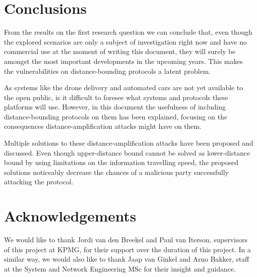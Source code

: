 \documentclass{article}
\begin{document}
\section{Conclusions}
\label{sec:conclusions}

From the results on the first research question we can conclude that, even though the explored scenarios are only a subject of investigation right now and have no commercial use at the moment of writing this document, they will surely be amongst the most important developments in the upcoming years. This makes the vulnerabilities on distance-bounding protocols a latent problem.

As systems like the drone delivery and automated cars are not yet available to the open public, is it difficult to foresee what systems and protocols these platforms will use. However, in this document the usefulness of including distance-bounding protocols on them has been explained, focusing on the consequences distance-amplification attacks might have on them.

Multiple solutions to these distance-amplification attacks have been proposed and discussed. Even though upper-distance bound cannot be solved as lower-distance bound by using limitations on the information travelling speed, the proposed solutions noticeably decrease the chances of a malicious party successfully attacking the protocol.




















\section{Acknowledgements}
\label{sec:acknowledgements}

We would like to thank Jordi van den Breekel and Paul van Iterson, supervisors of this project at KPMG, for their support over the duration of this project. In a similar way, we would also like to thank Jaap van Ginkel and Arno Bakker, staff at the System and Network Engineering MSc for their insight and guidance.







\printbibliography


\end{document}
